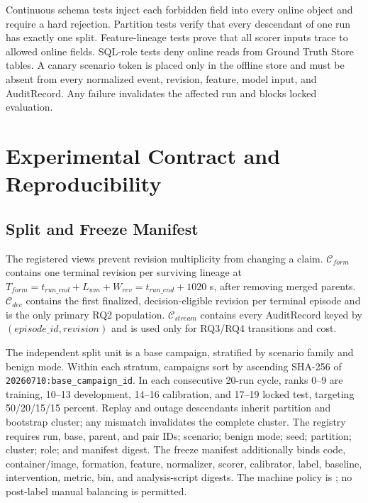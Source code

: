 Continuous schema tests inject each forbidden field into every online object and require a
hard rejection. Partition tests verify that every descendant of one run has exactly one split.
Feature-lineage tests prove that all scorer inputs trace to allowed online fields. SQL-role
tests deny online reads from Ground Truth Store tables. A canary scenario token is placed only
in the offline store and must be absent from every normalized event, revision, feature, model
input, and AuditRecord. Any failure invalidates the affected run and blocks locked evaluation.

\clearpage
\section{Experimental Contract and Reproducibility}
\label{app:experimental-contract}

\subsection{Split and Freeze Manifest}

The registered views prevent revision multiplicity from changing a claim. $\mathcal C_{form}$
contains one terminal revision per surviving lineage at
$T_{form}=t_{run\_end}+L_{wm}+W_{rev}=t_{run\_end}+1020$ s, after removing merged parents.
$\mathcal C_{dec}$ contains the first finalized, decision-eligible revision per terminal
episode and is the only primary RQ2 population. $\mathcal C_{stream}$ contains every
AuditRecord keyed by $(episode\_id,revision)$ and is used only for RQ3/RQ4 transitions and
cost.

The independent split unit is a base campaign, stratified by scenario family and benign mode.
Within each stratum, campaigns sort by ascending SHA-256 of
\texttt{20260710:base\_campaign\_id}. In each consecutive 20-run cycle, ranks 0--9 are
training, 10--13 development, 14--16 calibration, and 17--19 locked test, targeting
50/20/15/15 percent. Replay and outage descendants inherit partition and bootstrap cluster;
any mismatch invalidates the complete cluster. The registry requires run, base, parent, and
pair IDs; scenario; benign mode; seed; partition; cluster; role; and manifest digest. The
freeze manifest additionally binds code, container/image, formation, feature, normalizer,
scorer, calibrator, label, baseline, intervention, metric, bin, and analysis-script digests.
The machine policy is ; no post-label manual
balancing is permitted.

